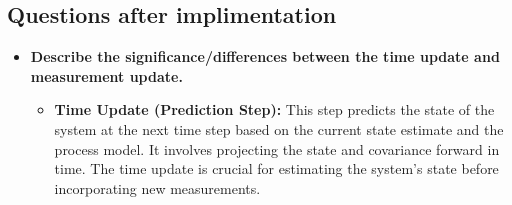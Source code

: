 \documentclass{article}
\begin{document}
\subsection*{Questions after implimentation}
\begin{itemize}
    \item \textbf{Describe the significance/differences between the time update and measurement update.}
    \begin{itemize}
        \item \textbf{Time Update (Prediction Step):} This step predicts the state of the system at the next
         time step based on the current state estimate and the process model.
          It involves projecting the state and covariance forward in time. The time update is crucial
           for estimating the system's state before incorporating new measurements.


\end{itemize}
\end{itemize}
\end{document}

